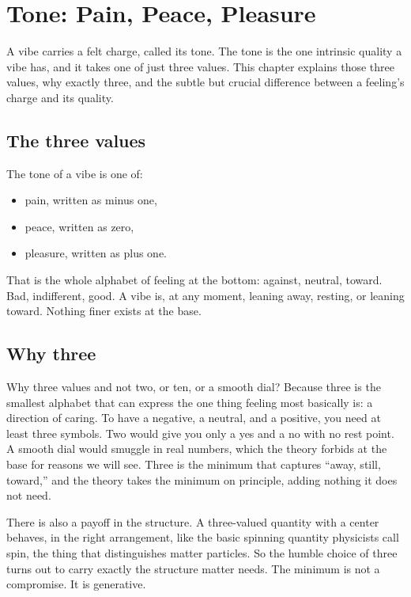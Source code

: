 \section{Tone: Pain, Peace, Pleasure}

A vibe carries a felt charge, called its tone. The tone is the one intrinsic quality a vibe has, and it takes one of just three values. This chapter explains those three values, why exactly three, and the subtle but crucial difference between a feeling's charge and its quality.

\subsection{The three values}

The tone of a vibe is one of:

\begin{itemize}
\item pain, written as minus one,
\item peace, written as zero,
\item pleasure, written as plus one.
\end{itemize}

That is the whole alphabet of feeling at the bottom: against, neutral, toward. Bad, indifferent, good. A vibe is, at any moment, leaning away, resting, or leaning toward. Nothing finer exists at the base.

\subsection{Why three}

Why three values and not two, or ten, or a smooth dial? Because three is the smallest alphabet that can express the one thing feeling most basically is: a direction of caring. To have a negative, a neutral, and a positive, you need at least three symbols. Two would give you only a yes and a no with no rest point. A smooth dial would smuggle in real numbers, which the theory forbids at the base for reasons we will see. Three is the minimum that captures ``away, still, toward,'' and the theory takes the minimum on principle, adding nothing it does not need.

There is also a payoff in the structure. A three-valued quantity with a center behaves, in the right arrangement, like the basic spinning quantity physicists call spin, the thing that distinguishes matter particles. So the humble choice of three turns out to carry exactly the structure matter needs. The minimum is not a compromise. It is generative.

